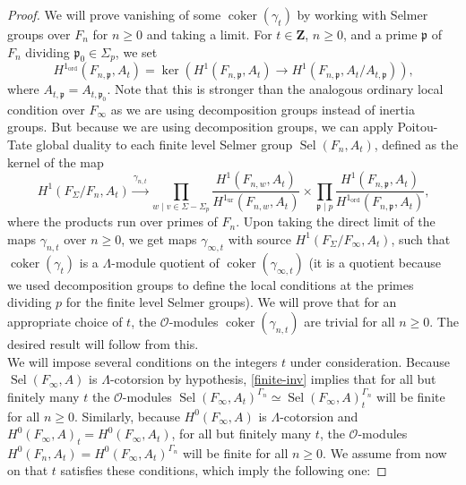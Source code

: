 \documentclass[12 pt]{amsart}
\theoremstyle{plain}
\theoremstyle{definition}
\numberwithin{equation}{section}
\numberwithin{table}{section}
\begin{document}
\begin{proof}
\indent We will prove vanishing of some $\operatorname{coker}(\gamma_t)$ by working with Selmer groups over $F_n$ for $n\geq 0$ and taking a limit. For $t\in\mathbf{Z}$, $n\geq 0$, and a prime $\mathfrak{p}$ of $F_n$ dividing $\mathfrak{p}_0\in\Sigma_p$, we set
\begin{equation*}
H^1_\operatorname{ord}(F_{n,\mathfrak{p}},A_t)=\ker(H^1(F_{n,\mathfrak{p}},A_t)\rightarrow H^1(F_{n,\mathfrak{p}},A_t/A_{t,\mathfrak{p}}))\text{,}
\end{equation*}
where $A_{t,\mathfrak{p}}=A_{t,\mathfrak{p}_0}$. Note that this is stronger than the analogous ordinary local condition over $F_\infty$ as we are using decomposition groups instead of inertia groups. But because we are using decomposition groups, we can apply Poitou-Tate global duality to each finite level Selmer group $\operatorname{Sel}(F_n,A_t)$, defined as the kernel of the map
\begin{equation*}
H^1(F_\Sigma/F_n,A_t)\xrightarrow{\gamma_{n,t}}\prod_{w\mid v\in\Sigma-\Sigma_p}\dfrac{H^1(F_{n,w},A_t)}{H^1_\operatorname{ur}(F_{n,w},A_t)}\times\prod_{\mathfrak{p}\mid p}
\dfrac{H^1(F_{n,\mathfrak{p}},A_t)}{H^1_\operatorname{ord}(F_{n,\mathfrak{p}},A_t)}\text{,}
\end{equation*}
where the products run over primes of $F_n$. Upon taking the direct limit of the maps $\gamma_{n,t}$ over $n\geq 0$, we get maps $\gamma_{\infty,t}$ with source $H^1(F_\Sigma/F_\infty,A_t)$, such that $\operatorname{coker}(\gamma_t)$ is a $\Lambda$-module quotient of $\operatorname{coker}(\gamma_{\infty,t})$ (it is a quotient because we used decomposition groups to define the local conditions at the primes dividing $p$ for the finite level Selmer groups). We will prove that for an appropriate choice of $t$, the $\mathscr{O}$-modules $\operatorname{coker}(\gamma_{n,t})$ are trivial for all $n\geq 0$. The desired result will follow from this.\\%
\indent We will impose several conditions on the integers $t$ under consideration. Because $\operatorname{Sel}(F_\infty,A)$ is $\Lambda$-cotorsion by hypothesis, \cref{finite-inv} implies that for all but finitely many $t$ the $\mathscr{O}$-modules $\operatorname{Sel}(F_\infty,A_t)^{\Gamma_n}\simeq \operatorname{Sel}(F_\infty,A)_t^{\Gamma_n}$ will be finite for all $n\geq 0$. Similarly, because $H^0(F_{\infty},A)$ is $\Lambda$-cotorsion and $H^0(F_\infty,A)_t=H^0(F_\infty,A_t)$, for all but finitely many $t$, the $\mathscr{O}$-modules $H^0(F_n,A_t)=H^0(F_\infty,A_t)^{\Gamma_n}$ will be finite for all $n\geq 0$. We assume from now on that $t$ satisfies these conditions, which imply the following one:

\end{proof}
\end{document}
